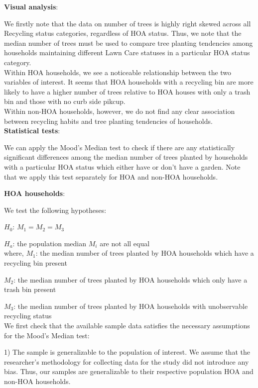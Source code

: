 \documentclass{article}
\begin{document}
\textbf{Visual analysis}:

We firstly note that the data on number of trees is highly right skewed across all Recycling status categories, regardless of HOA status. Thus, we note that the median number of trees must be used to compare tree planting tendencies among households maintaining different Lawn Care statuses in a particular HOA status category. \\

Within HOA households, we see a noticeable relationship between the two variables of interest. It seems that HOA households with a recycling bin are more likely to have a higher number of trees relative to HOA houses with only a trash bin and those with no curb side pikcup.\\

Within non-HOA households, however, we do not find any clear association between recycling habits and tree planting tendencies of households.\\

\textbf{Statistical tests}:

We can apply the Mood's Median test to check if there are any statistically significant differences among the median number of trees planted by households with a particular HOA status which either have or don't have a garden. Note that we apply this test separately for HOA and non-HOA households.

\textbf{HOA households}:

We test the following hypotheses:

$H_{0}$: $M_{1}=M_{2}=M_{3}$

$H_{a}$: the population median $M_{i}$ are not all equal\\

where, $M_{1}$: the median number of trees planted by HOA households which have a recycling bin present

$M_{2}$: the median number of trees planted by HOA households which only have a trash bin present

$M_{3}$: the median number of trees planted by HOA households with unobservable recycling status\\

We first check that the available sample data satisfies the necessary assumptions for the Mood's Median test:

1) The sample is generalizable to the population of interest. We assume that the researcher's methodology for collecting data for the study did not introduce any bias. Thus, our samples are generalizable to their respective population HOA and non-HOA households.\\
\end{document}
